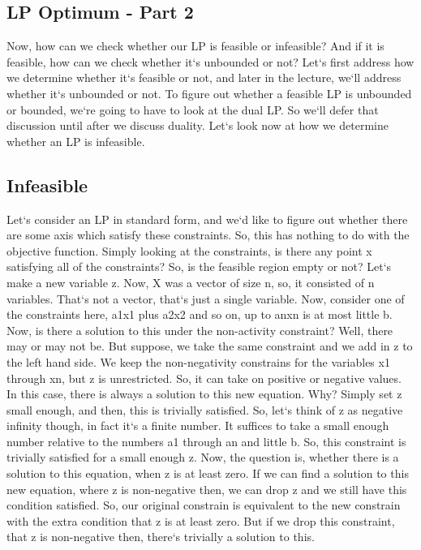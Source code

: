 \subsection{LP Optimum - Part 2}
Now, how can we check whether our LP is feasible or infeasible? And if it is feasible, how can we check whether it`s unbounded or not? Let`s first address how we determine whether it`s feasible or not, and later in the lecture, we`ll address whether it`s unbounded or not.
To figure out whether a feasible LP is unbounded or bounded, we`re going to have to look at the dual LP\@.
So we`ll defer that discussion until after we discuss duality.
Let`s look now at how we determine whether an LP is infeasible.

\subsection{Infeasible}
Let`s consider an LP in standard form, and we`d like to figure out whether there are some axis which satisfy these constraints.
So, this has nothing to do with the objective function.
Simply looking at the constraints, is there any point x satisfying all of the constraints? So, is the feasible region empty or not? Let`s make a new variable z.
Now, X was a vector of size n, so, it consisted of n variables.
That`s not a vector, that`s just a single variable.
Now, consider one of the constraints here, a1x1 plus a2x2 and so on, up to anxn is at most little b.
Now, is there a solution to this under the non-activity constraint? Well, there may or may not be.
But suppose, we take the same constraint and we add in z to the left hand side.
We keep the non-negativity constrains for the variables x1 through xn, but z is unrestricted.
So, it can take on positive or negative values.
In this case, there is always a solution to this new equation.
Why? Simply set z small enough, and then, this is trivially satisfied.
So, let`s think of z as negative infinity though, in fact it`s a finite number.
It suffices to take a small enough number relative to the numbers a1 through an and little b.
So, this constraint is trivially satisfied for a small enough z.
Now, the question is, whether there is a solution to this equation, when z is at least zero.
If we can find a solution to this new equation, where z is non-negative then, we can drop z and we still have this condition satisfied.
So, our original constrain is equivalent to the new constrain with the extra condition that z is at least zero.
But if we drop this constraint, that z is non-negative then, there`s trivially a solution to this.
